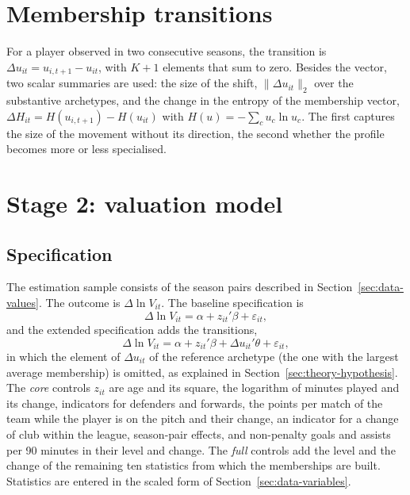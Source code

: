\section{Membership transitions}
\label{sec:method-transitions}

For a player observed in two consecutive seasons, the transition is $\Delta u_{it}=u_{i,t+1}-u_{it}$, with $K+1$ elements that sum to zero. Besides the vector, two scalar summaries are used: the size of the shift, $\lVert\Delta u_{it}\rVert_2$ over the substantive archetypes, and the change in the entropy of the membership vector, $\Delta H_{it}=H(u_{i,t+1})-H(u_{it})$ with $H(u)=-\sum_c u_c\ln u_c$. The first captures the size of the movement without its direction, the second whether the profile becomes more or less specialised.

\section{Stage 2: valuation model}
\label{sec:method-valuation}

\subsection{Specification}

The estimation sample consists of the season pairs described in Section~\ref{sec:data-values}. The outcome is $\Delta\ln V_{it}$. The baseline specification is
\begin{equation}
	\Delta\ln V_{it}=\alpha+z_{it}'\beta+\varepsilon_{it},
\end{equation}
and the extended specification adds the transitions,
\begin{equation}
	\Delta\ln V_{it}=\alpha+z_{it}'\beta+\Delta u_{it}'\theta+\varepsilon_{it},
	\label{eq:extended}
\end{equation}
in which the element of $\Delta u_{it}$ of the reference archetype (the one with the largest average membership) is omitted, as explained in Section~\ref{sec:theory-hypothesis}. The \emph{core} controls $z_{it}$ are age and its square, the logarithm of minutes played and its change, indicators for defenders and forwards, the points per match of the team while the player is on the pitch and their change, an indicator for a change of club within the league, season-pair effects, and non-penalty goals and assists per 90 minutes in their level and change. The \emph{full} controls add the level and the change of the remaining ten statistics from which the memberships are built. Statistics are entered in the scaled form of Section~\ref{sec:data-variables}.

